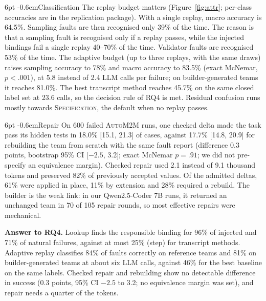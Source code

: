 \documentclass[pdflatex,sn-mathphys-num]{sn-jnl}
\makeatletter
\theoremstyle{thmstyleone}%
\theoremstyle{thmstyletwo}%
\theoremstyle{thmstylethree}%
\newcommand{\auto}{\textsc{AutoM2M}}
\renewcommand\paragraph{\@startsection{paragraph}{4}{\z@}%
  {6pt \@plus 2pt \@minus 1pt}{-0.6em}{\normalfont\normalsize\bfseries}}
\makeatother
\begin{document}
\paragraph{Classification} The replay budget matters (Figure~\ref{fig:attr};
per-class accuracies are in the replication package). With a single replay, macro accuracy is 64.5\%.
Sampling faults are then recognised only 39\% of the time. The reason is that a
sampling fault is recognised only if a replay passes, while the injected
bindings fail a single replay 40--70\% of the time. Validator faults are
recognised 53\% of the time. The adaptive budget (up to three replays, with the
same draws) raises sampling accuracy to 78\% and macro accuracy to 83.5\% (exact
McNemar, $p<.001$), at 5.8 instead of 2.4 LLM calls per failure; on
builder-generated teams it reaches 81.0\%. The best transcript method reaches
45.7\% on the same closed label set at 23.6 calls, so the decision rule of RQ4
is met. Residual confusion runs mostly towards \textsc{Specification}, the
default when no replay passes.

\paragraph{Repair} On 600 failed \auto{} runs, one checked delta made the task
pass its hidden tests in 18.0\% [15.1, 21.3] of cases, against 17.7\% [14.8,
20.9] for rebuilding the team from scratch with the same fault report
(difference 0.3 points, bootstrap 95\% CI [$-2.5$, 3.2]; exact McNemar
$p=.91$; we did not pre-specify an equivalence margin). Checked repair used 2.1
instead of 9.1 thousand tokens and preserved 82\% of previously accepted values.
Of the admitted deltas, 61\% were applied in place, 11\% by extension and 28\%
required a rebuild. The builder is the weak link: in our Qwen2.5-Coder 7B runs,
it returned an unchanged team in 70 of 105 repair rounds, so most effective
repairs were mechanical.

\begin{tcolorbox}[enhanced, colback=modelbg, colframe=modelbar, boxrule=0.5pt, arc=1pt, left=6pt, right=6pt, top=3pt, bottom=3pt]
\small\textbf{Answer to RQ4.} Lookup finds the responsible binding for 96\% of
injected and 71\% of natural failures, against at most 25\% (step) for transcript
methods. Adaptive replay classifies 84\% of faults correctly on reference teams
and 81\% on builder-generated teams at about six LLM calls, against 46\% for the
best baseline on the same labels. Checked repair and rebuilding show no
detectable difference in success (0.3 points, 95\% CI $-2.5$ to 3.2; no
equivalence margin was set), and repair needs a quarter of the tokens.
\end{tcolorbox}
\end{document}
